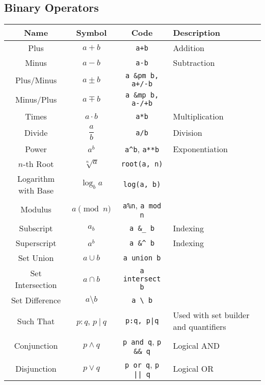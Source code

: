 \documentclass{article}
\begin{document}
  \subsection{Binary Operators} %
  \label{sub:binary_ops}
  \begin{table}[!h]
    \centering
    \begin{tabular}{|c|c|c|l|}
      \hline
      \textbf{Name} & \textbf{Symbol} & \textbf{Code} & \textbf{Description} \\
      \hline\hline

      Plus & \( a + b \) & \texttt{a+b} & Addition \\
      Minus & \( a - b \) & \texttt{a-b} & Subtraction \\
      Plus/Minus & \( a \pm b \) & \texttt{a \&pm b, a+/-b} & \\
      Minus/Plus & \( a \mp b \) & \texttt{a \&mp b, a-/+b} & \\
      Times & \( a \cdot b \) & \texttt{a*b} & Multiplication \\
      Divide & \( \dfrac{a}{b} \) & \texttt{a/b} & Division \\
      Power & \( a^b \) & \texttt{a\^{}b}, \texttt{a**b} & Exponentiation \\
      \( n \)-th Root & \( \sqrt[n]{a} \) & \texttt{root(a, n)} & \\
      Logarithm with Base & \( \log_b{a} \) & \texttt{log(a, b)} & \\
      Modulus & \( a \pmod{n} \) & \texttt{a\%n}, \texttt{a mod n} & \\
      \hline
      Subscript & \( a_b \) & \texttt{a \&\_ b} & Indexing \\
      Superscript & \( a^b \) & \texttt{a \&\^{} b} & Indexing \\
      \hline
      Set Union & \( a \cup b \) & \texttt{a union b} & \\
      Set Intersection & \( a \cap b \) & \texttt{a intersect b} & \\
      Set Difference & \( a \setminus b \) & \texttt{a \textbackslash \ b} & \\
      Such That & \( p : q \), \( p ~|~ q \) & \texttt{p:q, p|q} & Used with set builder and quantifiers \\
      \hline
      Conjunction & \( p \wedge q \) & \texttt{p and q}, \texttt{p \&\& q} & Logical AND \\
      Disjunction & \( p \vee q \) & \texttt{p or q}, \texttt{p || q} & Logical OR \\

\end{tabular}
\end{table}
\end{document}
